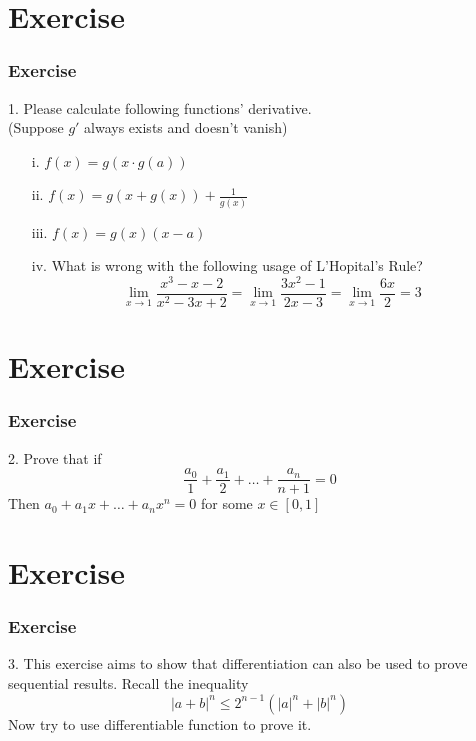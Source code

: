 \documentclass[12pt, t]{beamer}
\begin{document}
\section{Exercise}
\begin{frame}
    \frametitle{Exercise}
1. Please calculate following functions' derivative.\\(Suppose $g'$ always exists and doesn't vanish)
\begin{enumerate}
    \item[i.]   $f(x)=g(x\cdot g(a))$
    \item[ii.]  $f(x)=g(x+g(x))+\frac{1}{g(x)}$ 
    \item[iii.] $f(x) =g(x)(x-a)$
    \item[iv.]  What is wrong with the following usage of L'Hopital's Rule?\\
        \begin{equation*}
            \underset{x\rightarrow 1}{\lim}\frac{x^3-x-2}{x^2-3x+2}=\underset{x\rightarrow 1}{\lim}\frac{3x^2-1}{2x-3}=\underset{x\rightarrow 1}{\lim}\frac{6x}{2}=3
        \end{equation*}
\end{enumerate}

\end{frame}

\section{Exercise}
\begin{frame}
    \frametitle{Exercise}
2. Prove that if 
\begin{equation*}
    \frac{a_0}{1}+\frac{a_1}{2}+\dots+\frac{a_n}{n+1}=0
\end{equation*}
Then $a_0+a_1x+\dots+a_nx^n=0$ for some $x\in[0,1]$
\end{frame}

\section{Exercise}
\begin{frame}
    \frametitle{Exercise}
3. This exercise aims to show that differentiation can also be used to prove sequential results. Recall 
the inequality 
\begin{equation*}
    |a+b|^n\leq 2^{n-1}(|a|^n+|b|^n)
\end{equation*}
Now try to use differentiable function to prove it.
\end{frame}
\end{document}
